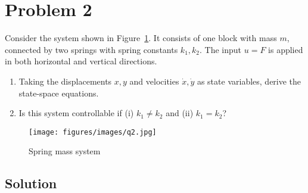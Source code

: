 \section*{Problem 2}

Consider the system shown in Figure~\ref{fig:q2}.
It consists of one block with mass \( m \), connected by two springs with spring constants \( k_{1}, k_{2} \).
The input \( u=F \) is applied in both horizontal and vertical directions.
\begin{enumerate}[label= (\alph*), topsep=3pt, itemsep=-0.2em]
    \item Taking the displacements \( x, y \) and velocities \( \dot{x}, \dot{y} \) as state variables, derive the state-space equations.
    \item Is this system controllable if (i) \( k_{1} \neq k_{2} \) and (ii) \( k_{1}=k_{2} \)?
\end{enumerate}
\begin{figure}[h]
    \centering
    \texttt{[image: figures/images/q2.jpg]}
    \caption{
        Spring mass system
    }\label{fig:q2}
\end{figure}
\vspace*{-2.5em}

\subsection*{Solution}
